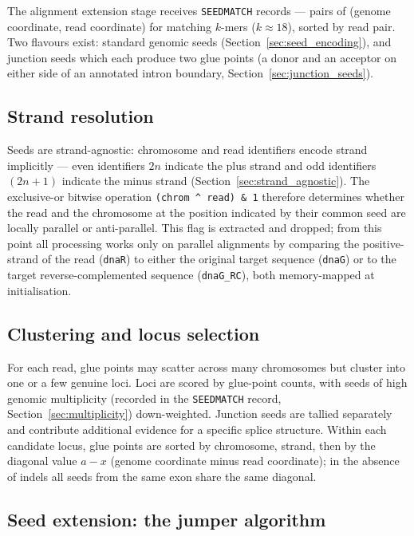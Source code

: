 \documentclass[11pt]{article}
\begin{document}
The alignment extension stage receives \texttt{SEEDMATCH} records ---
pairs of (genome coordinate, read coordinate) for matching $k$-mers
($k \approx 18$), sorted by read pair.
Two flavours exist: standard genomic seeds
(Section~\ref{sec:seed_encoding}),
and junction seeds which
each produce two glue points (a donor and an acceptor on either side
of an annotated intron boundary, Section~\ref{sec:junction_seeds}).

\subsection{Strand resolution}
\label{sec:strand_resolution}

Seeds are strand-agnostic: chromosome and read identifiers encode
strand implicitly --- even identifiers $2n$ indicate the plus strand
and odd identifiers $(2n+1)$ indicate the minus strand (Section~\ref{sec:strand_agnostic}).
The exclusive-or bitwise operation \texttt{(chrom \textasciicircum\ read) \& 1} therefore
determines whether the read and the chromosome at the position
indicated by their common seed are locally parallel or anti-parallel.
This flag is extracted and dropped; from this point all processing
works only on parallel alignments by comparing the positive-strand of the read (\texttt{dnaR}) to either
the original target sequence
(\texttt{dnaG}) or to the target reverse-complemented sequence  (\texttt{dnaG\_RC}), both memory-mapped at initialisation.

\subsection{Clustering and locus selection}
\label{sec:clustering}

For each read, glue points may scatter across many chromosomes but
cluster into one or a few genuine loci.
Loci are scored by glue-point counts, with seeds of high genomic
multiplicity (recorded in the \texttt{SEEDMATCH} record, Section~\ref{sec:multiplicity}) down-weighted.
Junction seeds are tallied separately and contribute additional
evidence for a specific splice structure.
Within each candidate locus, glue points are sorted by chromosome,
strand, then by the diagonal value $a - x$ (genome coordinate minus
read coordinate); in the absence of indels all seeds from the same
exon share the same diagonal.

\subsection{Seed extension: the jumper algorithm}
\label{sec:jumper}
\end{document}
